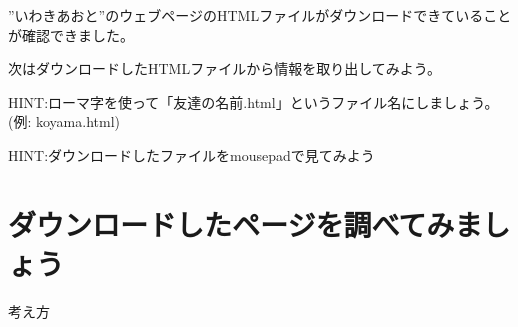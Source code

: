 \documentclass[text08.tex]{subfiles}
\begin{document}
\bigskip

”いわきあおと”のウェブページのHTMLファイルがダウンロードできていることが確認できました。

次はダウンロードしたHTMLファイルから情報を取り出してみよう。
\clearpage

\begin{tcolorbox}[title=\useOmetoi,breakable]\label{Q:port}
  \begin{enumerate}
    HINT:ローマ字を使って「友達の名前.html」というファイル名にしましょう。
    (例: koyama.html)
  \end{enumerate}
\end{tcolorbox}

\begin{tcolorbox}[title=\useOmetoi,breakable]\label{Q:HTML}
  \begin{enumerate}
    HINT:ダウンロードしたファイルをmousepadで見てみよう
  \end{enumerate}
\end{tcolorbox}




\clearpage

\section{ダウンロードしたページを調べてみましょう}\label{E:HTML}
考え方
\end{document}
